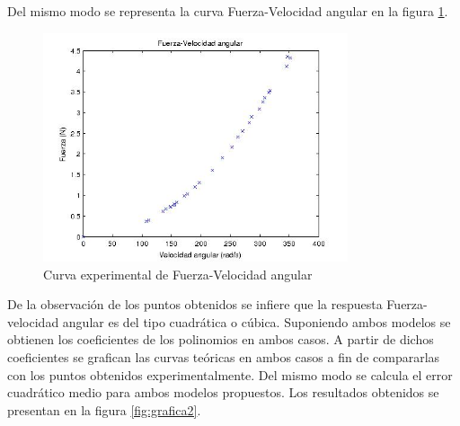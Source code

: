 \documentclass[spanish,12pt,a4paper,titlepage]{report}
\begin{document}
Del mismo modo se representa la curva Fuerza-Velocidad angular en la figura \ref{fig:grafica1}.


\begin{figure}
  \vspace{-20pt}
  \begin{center}
    \includegraphics[width=0.8\textwidth]{./Pics/puntosfvel.jpg}
  \end{center}
  \vspace{-20pt}
  \caption{Curva experimental de Fuerza-Velocidad angular}
  \label{fig:grafica1}
  \vspace{-10pt}
\end{figure}


De la observación de los puntos obtenidos se infiere que la respuesta Fuerza-velocidad angular es del tipo cuadrática o cúbica. Suponiendo ambos modelos se obtienen los coeficientes de los polinomios en ambos casos. A partir de dichos coeficientes se grafican las curvas teóricas en ambos casos a fin de compararlas con los puntos obtenidos experimentalmente. Del mismo modo se calcula el error cuadrático medio para ambos modelos propuestos. Los resultados obtenidos se presentan en la figura \ref{fig:grafica2}.
\end{document}
